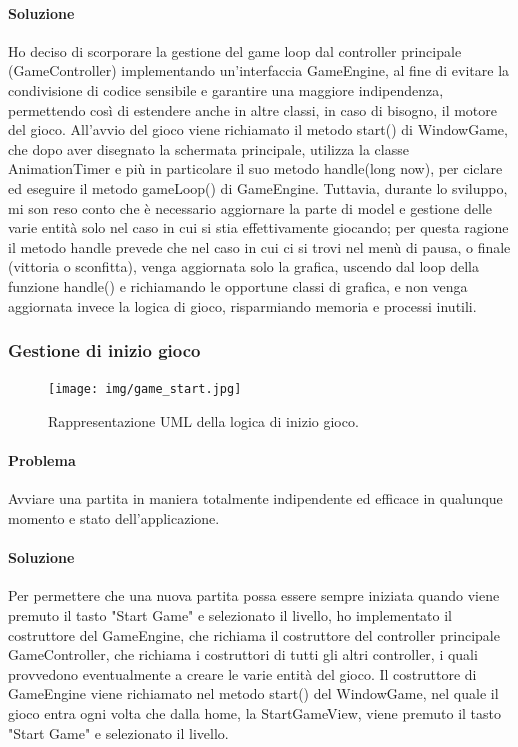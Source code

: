 \documentclass[a4paper,12pt]{report}
\begin{document}
\paragraph{Soluzione} Ho deciso di scorporare la gestione del game loop dal controller principale (GameController) implementando un’interfaccia GameEngine, al fine di evitare la condivisione di codice sensibile e garantire una maggiore indipendenza, permettendo così di estendere anche in altre classi, in caso di bisogno, il motore del gioco. All'avvio del gioco viene richiamato il metodo start() di WindowGame, che dopo aver disegnato la schermata principale, utilizza la classe AnimationTimer e più in particolare il suo metodo handle(long now), per ciclare ed eseguire il metodo gameLoop() di GameEngine. Tuttavia, durante lo sviluppo, mi son reso conto che è necessario aggiornare la parte di model e gestione delle varie entità solo nel caso in cui si stia effettivamente giocando; per questa ragione il metodo handle prevede che nel caso in cui ci si trovi nel menù di pausa, o finale (vittoria o sconfitta), venga aggiornata solo la grafica, uscendo dal loop della funzione handle() e richiamando le opportune classi di grafica, e non venga aggiornata invece la logica di gioco, risparmiando memoria e processi inutili.

\subsubsection{Gestione di inizio gioco}

\begin{figure}[H]
\centering{}
\texttt{[image: img/game\_start.jpg]}
\caption{Rappresentazione UML della logica di inizio gioco.}
\end{figure}

\paragraph{Problema} Avviare una partita in maniera totalmente indipendente ed efficace in qualunque momento e stato dell’applicazione.

\paragraph{Soluzione} Per permettere che una nuova partita possa essere sempre iniziata quando viene premuto il tasto "Start Game" e selezionato il livello, ho implementato il costruttore del GameEngine, che richiama il costruttore del controller principale GameController, che richiama i costruttori di tutti gli altri controller, i quali provvedono eventualmente a creare le varie entità del gioco. Il costruttore di GameEngine viene richiamato nel metodo start() del WindowGame, nel quale il gioco entra ogni volta che dalla home, la StartGameView, viene premuto il tasto "Start Game" e selezionato il livello.
\end{document}
